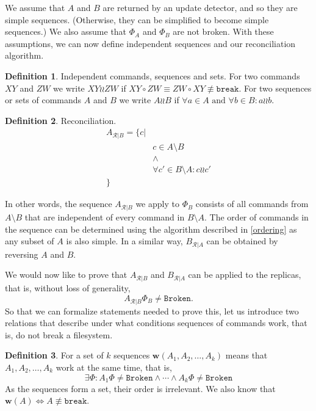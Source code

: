 \documentclass[12pt]{article}
\newcommand{\fsbroken}{\mathtt{Broken}} %
\newcommand{\FS}{\Phi} %
\newcommand{\cbrk}{\mathtt{break}} %
\newcommand{\fscommand}[2]{{#1#2}}
\newcommand{\cxy}{\fscommand{X}{Y}}
\newcommand{\czw}{\fscommand{Z}{W}}
\newcommand{\cc}{\circ} %
\newcommand{\nequiv}{\not\equiv}
\newcommand{\indep}{\mathrel{\wr\wr}} %
\newcommand{\workssign}{\mathbf{w}}
\newcommand{\works}[1]{\workssign({#1})}
\newcommand{\recchar}[3]{{#1}^{#3}_{\mathcal{R}|{#2}}}
\newcommand{\reca}{\recchar{A}{B}{}} %
\newcommand{\recb}{\recchar{B}{A}{}} %
\theoremstyle{definition}
\newtheorem{mydef}{Definition}
\begin{document}
We assume that $A$ and $B$ are returned by an update detector,
and so they are simple sequences.
(Otherwise, they can be simplified to become simple sequences.)
We also assume that $\FS_A$ and $\FS_B$ are not broken.
With these assumptions,
we can now define independent sequences and
our reconciliation algorithm.

\begin{mydef}{Independent commands, sequences and sets.}
For two commands $\cxy$ and $\czw$ we write $\cxy\indep\czw$ if $\cxy\cc \czw\equiv\czw\cc \cxy\nequiv\cbrk$.
For two sequences or sets of commands $A$ and $B$ we write $A\indep B$ if
$\forall a\in A \mbox{~and~} \forall b\in B: a\indep b$.
\end{mydef}

\begin{mydef}{Reconciliation.}\label{def:reconciliation}
\begin{align*}
\reca = \{c| & \\
& c\in A\setminus B \\
& \wedge \\
& \forall c'\in B\setminus A: c\indep c'\\
\} &
\end{align*}

In other words, the sequence $\reca$ we apply to $\FS_B$ consists of all commands from $A\setminus B$
that are independent of every command in $B\setminus A$.
The order of commands in the sequence can be determined using the algorithm described in
\cref{ordering} as any subset of $A$ is also simple.
In a similar way, $\recb$ can be obtained by reversing $A$ and $B$.
\end{mydef}

We would now like to prove that $\reca$ and $\recb$ can be applied to the replicas,
that is, without loss of generality,
\[ \reca\FS_B\neq\fsbroken. \]
So that we can formalize statements needed to prove this,
let us introduce two relations that describe under what conditions
sequences of commands work, that is, do not break a filesystem.



\begin{mydef}
For a set of $k$ sequences
$\works{A_1,A_2,\ldots,A_k}$ means that 
$A_1,A_2,\ldots,A_k$ work at the same time, that is,
\[\exists \FS: A_1\FS\neq\fsbroken \wedge \cdots \wedge A_k\FS\neq\fsbroken\]
As the sequences form a set, their order is irrelevant.
We also know that $\works{A} \Leftrightarrow A\nequiv \cbrk$. 
\end{mydef}
\end{document}
